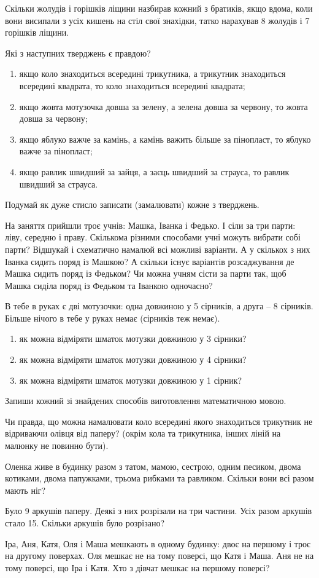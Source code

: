 Скільки жолудів і горішків ліщини назбирав кожний з братиків,
якщо вдома, коли вони висипали з усіх кишень на стіл свої знахідки,
татко нарахував 8 жолудів і 7 горішків ліщини.


\problem
Які з наступних тверджень є правдою?
\begin{enumerate}
    \item якщо коло знаходиться всередині трикутника,
    а трикутник знаходиться всередині квадрата,
    то коло знаходиться всередині квадрата;
    \item якщо жовта мотузочка довша за зелену,
    а зелена довша за червону, то жовта довша за червону;
    \item якщо яблуко важче за камінь, а камінь важить більше за пінопласт,
    то яблуко важче за пінопласт;
    \item якщо равлик швидший за зайця, а заєць швидший за страуса,
    то равлик швидший за страуса.
\end{enumerate}
Подумай як дуже стисло записати (замалювати) кожне з тверджень.


\problem
На заняття прийшли троє учнів: Машка, Іванка і Федько.
І сіли за три парти: ліву, середню і праву.
Скількома різними способами учні можуть вибрати собі парти?
Відшукай і схематично намалюй всі можливі варіанти.
А у скількох з них Іванка сидить поряд із Машкою?
А скільки існує варіантів розсаджування де Машка сидить поряд із Федьком?
Чи можна учням сісти за парти так,
щоб Машка сиділа поряд із Федьком та Іванкою одночасно?



\problem
В тебе в руках є дві мотузочки:
одна довжиною у 5 сірників, а друга – 8 сірників.
Більше нічого в тебе у руках немає (сірників теж немає).
\begin{enumerate}
    \item як можна відміряти шматок мотузки довжиною у 3 сірники?
    \item як можна відміряти шматок мотузки довжиною у 4 сірники?
    \item як можна відміряти шматок мотузки довжиною у 1 сірник?
\end{enumerate}
Запиши кожний зі знайдених способів виготовлення математичною мовою.


\problem
Чи правда, що можна намалювати коло всередині якого знаходиться
трикутник не відриваючи олівця від паперу?
(окрім кола та трикутника, інших ліній на малюнку не повинно бути).


\problem
Оленка живе в будинку разом з татом, мамою, сестрою, одним песиком,
двома котиками, двома папужками, трьома рибками та равликом.
Скільки вони всі разом мають ніг?


\problem
Було 9 аркушів паперу. Деякі з них розрізали на три частини.
Усіх разом аркушів стало 15.
Скільки аркушів було розрізано?


\problem
Іра, Аня, Катя, Оля і Маша мешкають в одному будинку:
двоє на першому і троє на другому поверхах.
Оля мешкає не на тому поверсі, що Катя і Маша.
Аня не на тому поверсі, що Іра і Катя.
Хто з дівчат мешкає на першому поверсі?
